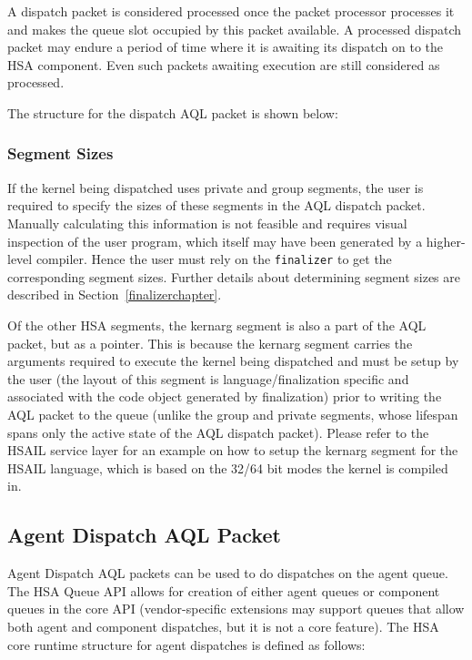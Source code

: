 \documentclass{book}
\begin{document}
A dispatch packet is considered processed once the packet processor
processes it and makes the queue slot occupied by this packet
available. A processed dispatch packet may endure a period of time
where it is awaiting its dispatch on to the HSA component. Even such
packets awaiting execution are still considered as processed.

The structure for the dispatch AQL packet is shown below:



\hypertarget{segment_sizes}{}\subsubsection{Segment
Sizes}\label{segment_sizes}
If the kernel being dispatched uses private and group segments, the
user is required to specify the sizes of these segments in the AQL
dispatch packet. Manually calculating this information is not
feasible and requires visual inspection of the user program, which itself
may have been generated by a higher-level compiler. Hence the user
must rely on the \texttt{finalizer} to get the corresponding segment
sizes. Further details about determining segment sizes are described in
Section~\ref{finalizerchapter}.

Of the other HSA segments, the kernarg segment is also a part of the
AQL packet, but as a pointer. This is because the kernarg segment
carries the arguments required to execute the kernel being dispatched
and must be setup by the user (the layout of this segment is
language/finalization specific and associated with the code object
generated by finalization) prior to writing the AQL packet to the
queue (unlike the group and private segments, whose lifespan spans
only the active state of the AQL dispatch packet).  Please refer to
the HSAIL service layer for an example on how to setup the kernarg
segment for the HSAIL language, which is based on the 32/64 bit modes
the kernel is compiled in.

\hypertarget{agent_packet}{}\subsection{Agent Dispatch AQL
Packet}\label{agent_packet}
Agent Dispatch AQL packets can be used to do dispatches on the agent
queue. The HSA Queue API allows for creation of either agent queues
or component queues in the core API (vendor-specific extensions may
support queues that allow both agent and component dispatches, but
it is not a core feature). The HSA core runtime structure for agent
dispatches is defined as follows:
\end{document}
